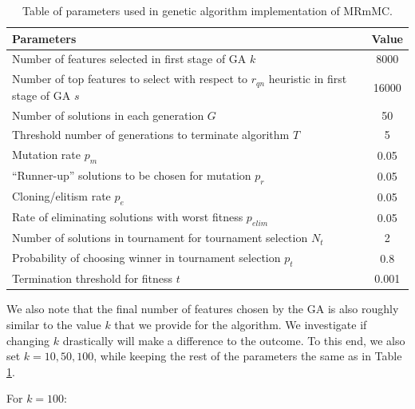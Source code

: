 \documentclass[12pt, twoside, a4paper]{report}
\begin{document}
\begin{table}
\begin{center}
    \begin{tabular}{| p{12cm} | c |} \hline
    Parameters & Value \\ \hline \hline
    Number of features selected in first stage of GA $k$ & 8000 \\ \hline
    Number of top features to select with respect to $r_{qn}$ heuristic in first stage of GA $s$ & 16000 \\ \hline
    Number of solutions in each generation $G$ & 50 \\ \hline
    Threshold number of generations to terminate algorithm $T$ & 5 \\ \hline
    Mutation rate $p_m$ &  0.05 \\ \hline
    ``Runner-up'' solutions to be chosen for mutation $p_r$ & 0.05 \\ \hline
    Cloning/elitism rate $p_e$ & 0.05 \\ \hline
    Rate of eliminating solutions with worst fitness $p_{elim}$ & 0.05 \\ \hline
    Number of solutions in tournament for tournament selection $N_t$ & 2 \\ \hline
    Probability of choosing winner in tournament selection $p_t$ & 0.8 \\ \hline
    Termination threshold for fitness $t$ & 0.001 \\ \hline
    \end{tabular}
\end{center}
\caption{Table of parameters used in genetic algorithm implementation of MRmMC.}
\label{ga:mrmmc:params_1}
\end{table}

We also note that the final number of features chosen by the GA is also roughly similar to the value $k$ that we provide for the algorithm. We investigate if changing $k$ drastically will make a difference to the outcome. To this end, we also set $k=10,50,100$, while keeping the rest of the parameters the same as in Table \ref{ga:mrmmc:params_1}.

For $k=100$:
\end{document}
